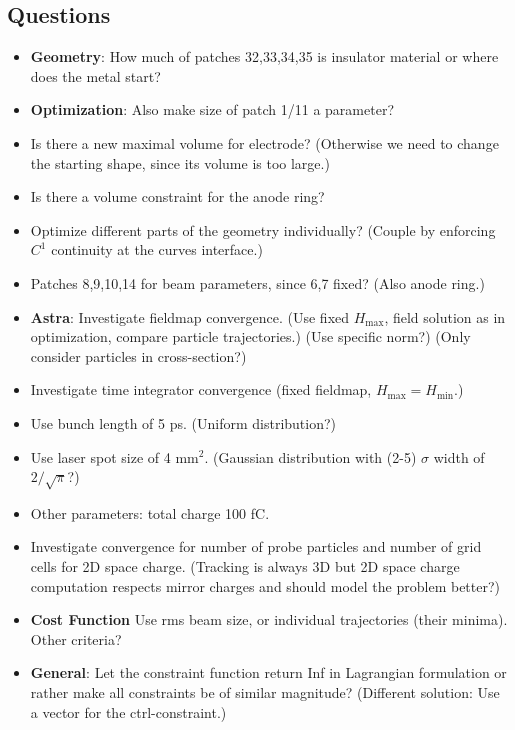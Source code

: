 \subsection{Questions}
\begin{itemize}
   \item \textbf{Geometry}: How much of patches 32,33,34,35 is insulator material or where does the metal start?\\

   \item \textbf{Optimization}: Also make size of patch 1/11 a parameter?
   \item Is there a new maximal volume for electrode? (Otherwise we need to change the starting shape, since its volume is too large.)
   \item Is there a volume constraint for the anode ring?
   \item Optimize different parts of the geometry individually? (Couple by enforcing $C^1$ continuity at the curves interface.)
   \item Patches 8,9,10,14 for beam parameters, since 6,7 fixed? (Also anode ring.)\\

   \item \textbf{Astra}: Investigate fieldmap convergence. (Use fixed $H_\mathrm{max}$, field solution as in optimization, compare particle trajectories.) (Use specific norm?) (Only consider particles in cross-section?)
   \item Investigate time integrator convergence (fixed fieldmap, $H_\mathrm{max}=H_\mathrm{min}$.)

   \item Use bunch length of 5 ps. (Uniform distribution?)
   \item Use laser spot size of 4 $\mathrm{mm}^2$. (Gaussian distribution with (2-5) $\sigma$ width of $2/\sqrt{\pi}$?)
   \item Other parameters: total charge 100 fC.

   \item Investigate convergence for number of probe particles and number of grid cells for 2D space charge. (Tracking is always 3D but 2D space charge computation respects mirror charges and should model the problem better?)

   \item \textbf{Cost Function} Use rms beam size, or individual trajectories (their minima). Other criteria?

   \item \textbf{General}: Let the constraint function return Inf in Lagrangian formulation or rather make all constraints be of similar magnitude? (Different solution: Use a vector for the ctrl-constraint.)\\
\end{itemize}

